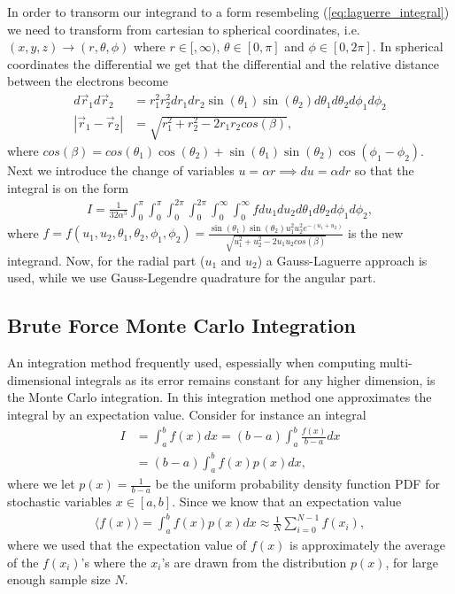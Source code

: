 \documentclass[twocolumn]{aastex62}
\begin{document}
In order to transorm our integrand to a form resembeling
(\ref{eq:laguerre_integral}) we need to transform from cartesian to spherical
coordinates, i.e. $(x, y, z)\to(r, \theta, \phi)$ where $r\in[,\infty)$,
$\theta\in[0,\pi]$ and $\phi\in[0,2\pi]$. In spherical coordinates the
differential we get that the differential and the relative distance between the
electrons become 
\begin{align}
	d\vec{r}_1d\vec{r}_2 &= r_1^2r_2^2 dr_1dr_2\sin(\theta_1)\sin(\theta_2)d\theta_1d\theta_2d\phi_1d\phi_2\\
	|\vec{r}_1 - \vec{r}_2| &= \sqrt{r_1^2 + r_2^2 - 2r_1r_2cos(\beta)},
\end{align}
where $cos(\beta) = cos(\theta_1)\cos(\theta_2) +
\sin(\theta_1)\sin(\theta_2)\cos(\phi_1 - \phi_2)$. Next we introduce the change
of variables $u = \alpha r \implies du = \alpha dr$ so that the integral is on
the form
\begin{align}
	I = \frac{1}{32 \alpha^5} \int^\pi_0\int^{\pi}_0\int^{2\pi}_0\int^{2\pi}_0\int^\infty_0\int^\infty_0 fdu_1du_2d\theta_1d\theta_2d\phi_1d\phi_2,
	\label{eq:spherical_integral}
\end{align}
where $f = f(u_1, u_2, \theta_1, \theta_2, \phi_1, \phi_2) = \frac{\sin
	(\theta_1)\sin(\theta_2)u_1^2u_2^2e^{-(u_1+u_2)}}{\sqrt{u_1^2 + u_2^2 -
	2u_1u_2cos(\beta)}}$ is the new integrand. Now, for the radial part ($u_1$
	and $u_2$) a Gauss-Laguerre approach is used, while we use Gauss-Legendre
	quadrature for the angular part. 

\subsection{Brute Force Monte Carlo Integration}\label{subsec:brute_force_monte_carlo}
An integration method frequently used, espessially when computing
multi-dimensional integrals as its error remains constant for any higher
dimension, is the Monte Carlo integration. In this integration method one
approximates the integral by an expectation value. Consider for instance an
integral 
\begin{align}
	I &= \int^b_a f(x)dx = (b-a)\int^b_a\frac{f(x)}{b-a}dx \\	
	&= (b-a)\int^b_af(x)p(x)dx,
\end{align}
where we let $p(x) = \frac{1}{b-a}$ be the uniform probability density function
PDF for stochastic variables $x\in[a, b]$. Since we know that an expectation
value 
\begin{align}
	\langle f(x)\rangle = \int^b_a f(x)p(x)dx \approx \frac{1}{N}\sum_{i=0}^{N-1} f(x_i),
\end{align}
where we used that the expectation value of $f(x)$ is approximately the average
of the $f(x_i)$'s where the $x_i$'s are drawn from the distribution $p(x)$, for
large enough sample size $N$. 
\end{document}
